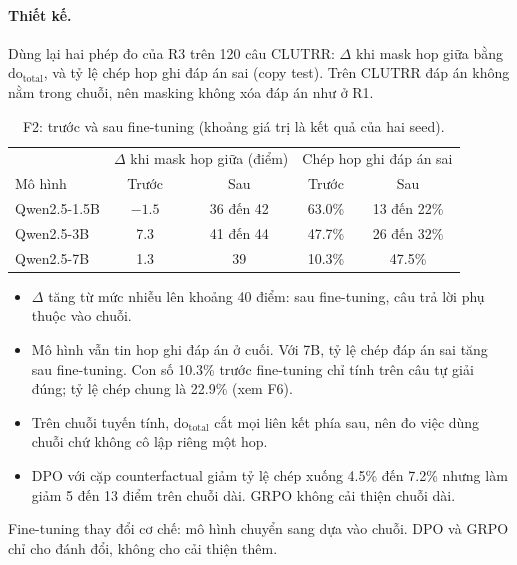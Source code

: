 \documentclass[11pt]{article}
\newcommand{\dt}{\mathrm{do}_{\text{total}}}
\begin{document}
\paragraph{Thiết kế.} Dùng lại hai phép đo của R3 trên 120 câu CLUTRR: $\Delta$ khi mask hop giữa bằng
$\dt$, và tỷ lệ chép hop ghi đáp án sai (copy test). Trên CLUTRR đáp án không nằm trong chuỗi, nên
masking không xóa đáp án như ở R1.

\begin{table}[h]
\centering\small
\caption{F2: trước và sau fine-tuning (khoảng giá trị là kết quả của hai seed).}
\begin{tabular}{lcccc}
\toprule
 & \multicolumn{2}{c}{$\Delta$ khi mask hop giữa (điểm)} & \multicolumn{2}{c}{Chép hop ghi đáp án sai} \\
Mô hình & Trước & Sau & Trước & Sau \\
\midrule
Qwen2.5-1.5B & $-1.5$ & 36 đến 42 & 63.0\% & 13 đến 22\% \\
Qwen2.5-3B & 7.3 & 41 đến 44 & 47.7\% & 26 đến 32\% \\
Qwen2.5-7B & 1.3 & 39 & 10.3\% & 47.5\% \\
\bottomrule
\end{tabular}
\end{table}

\begin{cachdoc}
\begin{itemize}[leftmargin=*,itemsep=1pt]
\item $\Delta$ tăng từ mức nhiễu lên khoảng 40 điểm: sau fine-tuning, câu trả lời phụ thuộc vào chuỗi.
\item Mô hình vẫn tin hop ghi đáp án ở cuối. Với 7B, tỷ lệ chép đáp án sai tăng sau fine-tuning. Con số
  10.3\% trước fine-tuning chỉ tính trên câu tự giải đúng; tỷ lệ chép chung là 22.9\% (xem F6).
\item Trên chuỗi tuyến tính, $\dt$ cắt mọi liên kết phía sau, nên đo việc dùng chuỗi chứ không cô lập
  riêng một hop.
\item DPO với cặp counterfactual giảm tỷ lệ chép xuống 4.5\% đến 7.2\% nhưng làm giảm 5 đến 13 điểm trên
  chuỗi dài. GRPO không cải thiện chuỗi dài.
\end{itemize}
\end{cachdoc}

\begin{ketluan}
Fine-tuning thay đổi cơ chế: mô hình chuyển sang dựa vào chuỗi. DPO và GRPO chỉ cho đánh đổi, không cho
cải thiện thêm.
\end{ketluan}
\end{document}
